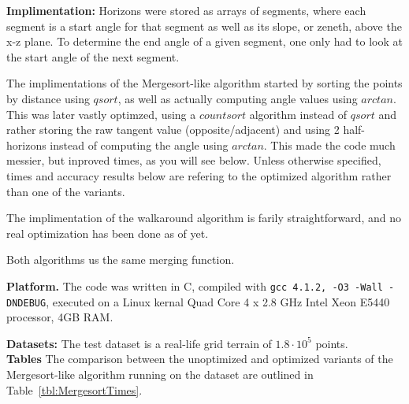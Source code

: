 \documentclass[11pt,twocolumn]{article}
\begin{document}
{\bf Implimentation:}
Horizons were stored as arrays of segments, where each segment is a start angle for that segment as well as its slope, or zeneth, above the x-z plane.  To determine the end angle of a given segment, one only had to look at the start angle of the next segment.

The implimentations of the Mergesort-like algorithm started by sorting the points by distance using $qsort$, as well as actually computing angle values using $arctan$.  This was later vastly optimzed, using a $countsort$ algorithm instead of $qsort$ and rather storing the raw tangent value (opposite/adjacent) and using 2 half-horizons instead of computing the angle using $arctan$.  This made the code much messier, but inproved times, as you will see below.  Unless otherwise specified, times and accuracy results below are refering to the optimized algorithm rather than one of the variants.

The implimentation of the walkaround algorithm is farily straightforward, and no real optimization has been done as of yet.

Both algorithms us the same merging function.

{\bf Platform.} The code was written in C, compiled with \texttt{gcc
  4.1.2, -O3 -Wall -DNDEBUG}, executed on a Linux kernal Quad Core 4 x 2.8 GHz Intel Xeon E5440 processor, 4GB RAM.

{\bf Datasets: } The test dataset is a real-life grid terrain of $1.8\cdot 10^5$ points.\\

{\bf Tables}
The comparison between the unoptimized and optimized variants of the Mergesort-like algorithm running on the dataset are outlined in Table~\ref{tbl:MergesortTimes}.

\begin{table}[htp]
  \caption{Running times (seconds) and CPU-utilization for the variants of the Mergesort-like algorithm.}
  \label{tbl:MergesortTimes}
\end{table}
\end{document}
